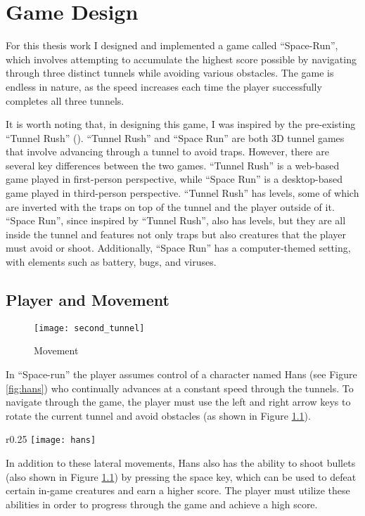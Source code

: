 \chapter{Game Design}
For this thesis work I designed and implemented a game called ``Space-Run'', which involves attempting to accumulate the highest score possible by navigating through three distinct tunnels while avoiding various obstacles. The game is endless in nature, as the speed increases each time the player successfully completes all three tunnels. 

It is worth noting that, in designing this game, I was inspired by the pre-existing ``Tunnel Rush'' (\cite{tunnelrush}). ``Tunnel Rush'' and ``Space Run'' are both 3D tunnel games that involve advancing through a tunnel to avoid traps. However, there are several key differences between the two games. ``Tunnel Rush'' is a web-based game played in first-person perspective, while ``Space Run'' is a desktop-based game played in third-person perspective. ``Tunnel Rush'' has levels, some of which are inverted with the traps on top of the tunnel and the player outside of it. ``Space Run'', since inspired by ``Tunnel Rush'', also has levels, but they are all inside the tunnel and features not only traps but also creatures that the player must avoid or shoot. Additionally, ``Space Run'' has a computer-themed setting, with elements such as battery, bugs, and viruses.

\section{Player and Movement}

\begin{figure}[h]
    \centering
    \texttt{[image: second\_tunnel]}
    \caption{Movement}
    \label{fig:snd_tunnel}
\end{figure}

In ``Space-run'' the player assumes control of a character named Hans (see Figure \ref{fig:hans}) who continually advances at a constant speed through the tunnels. To navigate through the game, the player must use the left and right arrow keys to rotate the current tunnel and avoid obstacles (as shown in Figure \ref{fig:snd_tunnel}). 
\begin{wrapfigure}{r}{0.25\textwidth}
    \centering
    \texttt{[image: hans]}
    \caption{Hans}
    \label{fig:hans}
\end{wrapfigure}
In addition to these lateral movements, Hans also has the ability to shoot bullets (also shown in Figure \ref{fig:snd_tunnel}) by pressing the space key, which can be used to defeat certain in-game creatures and earn a higher score. The player must utilize these abilities in order to progress through the game and achieve a high score.


